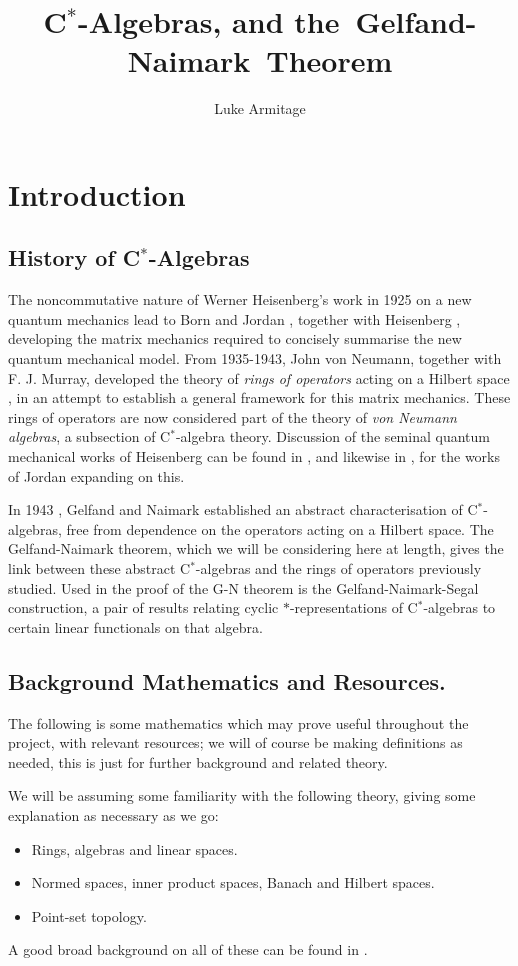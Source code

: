 \documentclass[12pt,a4paper]{amsart}
\author{Luke Armitage}
\title{C$^\ast$-Algebras, and the~Gelfand-Naimark~Theorem}
\theoremstyle{plain}
\theoremstyle{definition}
\begin{document}
\maketitle
\section{Introduction}
\subsection{History of C$^\ast$-Algebras}
	The noncommutative nature of Werner Heisenberg's work in 1925 on a new quantum mechanics \cite{heisenberg25} lead to Born and Jordan \cite{bornjordan25}, together with Heisenberg \cite{bornjordanheisenberg25}, developing the matrix mechanics required to concisely summarise the new quantum mechanical model. 
	From 1935-1943, John von Neumann, together with F. J. Murray, developed the theory of \emph{rings of operators} acting on a Hilbert space \cite{vonneumann35,vonneumann37,vonneumann43,vonneumann40}, in an attempt to establish a general framework for this matrix mechanics.
	These rings of operators are now considered part of the theory of \emph{von Neumann algebras}, a subsection of C$^\ast$-algebra theory. 
	Discussion of the seminal quantum mechanical works of Heisenberg can be found in \cite{mackinnon77}, and likewise in \cite{schroer03}, for the works of Jordan expanding on this.
	
	In 1943 \cite{gelfand43}, Gelfand and Naimark established an abstract characterisation of C$^\ast$-algebras, free from dependence on the operators acting on a Hilbert space.
	The Gelfand-Naimark theorem, which we will be considering here at length, gives the link between these abstract C$^\ast$-algebras and the rings of operators previously studied.
	Used in the proof of the G-N theorem is the Gelfand-Naimark-Segal construction, a pair of results relating cyclic $\ast$-representations of C$^\ast$-algebras to certain linear functionals on that algebra. 
	
	
\subsection{Background Mathematics and Resources.}	
	The following is some mathematics which may prove useful throughout the project, with relevant resources; we will of course be making definitions as needed, this is just for further background and related theory.

	We will be assuming some familiarity with the following theory, giving some explanation as necessary as we go:
\begin{itemize}
	\item Rings, algebras and linear spaces.
	\item Normed spaces, inner product spaces, Banach and Hilbert spaces.
	\item Point-set topology.
\end{itemize}
	A good broad background on all of these can be found in \cite{simmons83}.
\end{document}
